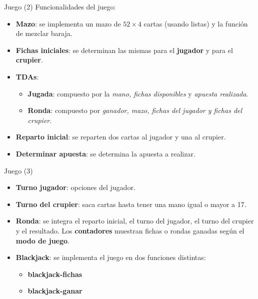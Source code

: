 \begin{frame}{Juego (2)}
    Funcionalidades del juego:
    \begin{itemize}
        \item \textbf{Mazo}: se implementa un mazo de $52 \times 4$ cartas (usando listas) y la función de mezclar baraja.
        \item \textbf{Fichas iniciales}: se determinan las mismas para el \textbf{jugador} y para el \textbf{crupier}.    
        \item \textbf{TDAs}:
        \begin{itemize}
            \item \textbf{Jugada}: compuesto por la \textit{mano, fichas disponibles} y \textit{apuesta realizada}.
            \item \textbf{Ronda}: compuesto por \textit{ganador, mazo, fichas del jugador y fichas del crupier}.
        \end{itemize}
        \item \textbf{Reparto inicial}: se reparten dos cartas al jugador y una al crupier.
        \item \textbf{Determinar apuesta}: se determina la apuesta a realizar.
    \end{itemize}
\end{frame}
\begin{frame}{Juego (3)}
\begin{itemize}
    \item \textbf{Turno jugador}: opciones del jugador.
    \item \textbf{Turno del crupier}: saca cartas hasta tener una mano igual o mayor a 17.
    \item \textbf{Ronda}: se integra el reparto inicial, el turno del jugador, el turno del crupier y el resultado. Los \textbf{contadores} muestran fichas o rondas ganadas según el \textbf{modo de juego}. 
    \item \textbf{Blackjack}: se implementa el juego en dos funciones distintas:
    \begin{itemize}
        \item \textbf{blackjack-fichas}
        \item \textbf{blackjack-ganar}
    \end{itemize}
\end{itemize}
\end{frame}